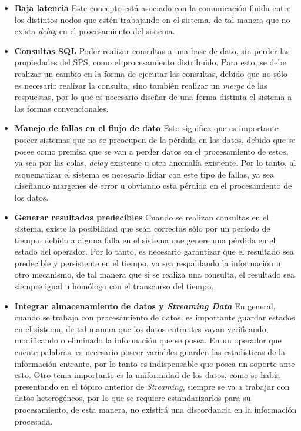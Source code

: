 \begin{itemize}
	\item \textbf{Baja latencia} Este concepto está asociado con la comunicación fluida entre los distintos nodos que estén trabajando en el sistema, de tal manera que no exista \textit{delay} en el procesamiento del sistema.
	\item \textbf{Consultas SQL} Poder realizar consultas a una base de dato, sin perder las propiedades del SPS, como el procesamiento distribuido. Para esto, se debe realizar un cambio en la forma de ejecutar las consultas, debido que no sólo es necesario realizar la consulta, sino también realizar un \textit{merge} de las respuestas, por lo que es necesario diseñar de una forma distinta el sistema a las formas convencionales.
	\item \textbf{Manejo de fallas en el flujo de dato} Esto significa que es importante poseer sistemas que no se preocupen de la pérdida en los datos, debido que se posee como premisa que se van a perder datos en el procesamiento de estos, ya sea por las colas, \textit{delay} existente u otra anomalía existente. Por lo tanto, al esquematizar el sistema es necesario lidiar con este tipo de fallas, ya sea diseñando margenes de error u obviando esta pérdida en el procesamiento de los datos.
	\item \textbf{Generar resultados predecibles} %
	Cuando se realizan consultas en el sistema, existe la posibilidad que sean correctas sólo por un período de tiempo, debido a alguna falla en el sistema que genere una pérdida en el estado del operador. Por lo tanto, es necesario garantizar que el resultado sea predecible y persistente en el tiempo, ya sea respaldando la información u otro mecanismo, de tal manera que si se realiza una consulta, el resultado sea siempre igual u homólogo con el transcurso del tiempo.
	\item \textbf{Integrar almacenamiento de datos y \textit{Streaming Data}} En general, cuando se trabaja con procesamiento de datos, es importante guardar estados en el sistema, de tal manera que los datos entrantes vayan verificando, modificando o eliminado la información que se posea. En un operador que cuente palabras, es necesario poseer variables guarden las estadísticas de la información entrante, por lo tanto es indispensable que posea un soporte ante esto. Otro tema importante es la uniformidad de los datos, como se había presentando en el tópico anterior de \textit{Streaming}, siempre se va a trabajar con datos heterogéneos, por lo que se requiere estandarizarlos para su procesamiento, de esta manera, no existirá una discordancia en la información procesada.

\end{itemize}
